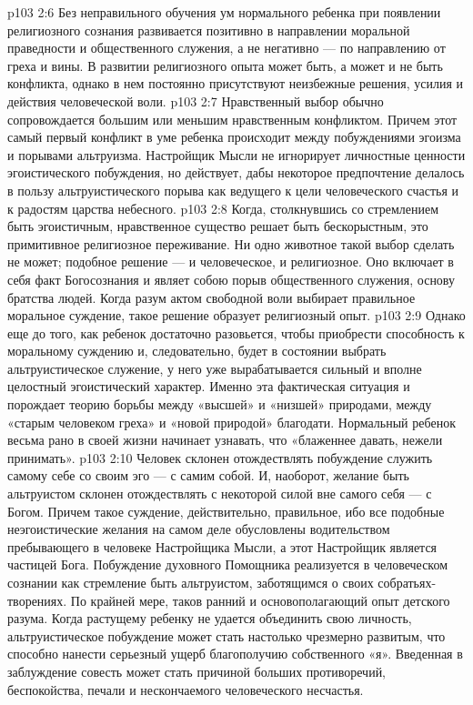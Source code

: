 \vs p103 2:6 Без неправильного обучения ум нормального ребенка при появлении религиозного сознания развивается позитивно в направлении моральной праведности и общественного служения, а не негативно --- по направлению от греха и вины. В развитии религиозного опыта может быть, а может и не быть конфликта, однако в нем постоянно присутствуют неизбежные решения, усилия и действия человеческой воли.
\vs p103 2:7 Нравственный выбор обычно сопровождается большим или меньшим нравственным конфликтом. Причем этот самый первый конфликт в уме ребенка происходит между побуждениями эгоизма и порывами альтруизма. Настройщик Мысли не игнорирует личностные ценности эгоистического побуждения, но действует, дабы некоторое предпочтение делалось в пользу альтруистического порыва как ведущего к цели человеческого счастья и к радостям царства небесного.
\vs p103 2:8 Когда, столкнувшись со стремлением быть эгоистичным, нравственное существо решает быть бескорыстным, это примитивное религиозное переживание. Ни одно животное такой выбор сделать не может; подобное решение --- и человеческое, и религиозное. Оно включает в себя факт Богосознания и являет собою порыв общественного служения, основу братства людей. Когда разум актом свободной воли выбирает правильное моральное суждение, такое решение образует религиозный опыт.
\vs p103 2:9 Однако еще до того, как ребенок достаточно разовьется, чтобы приобрести способность к моральному суждению и, следовательно, будет в состоянии выбрать альтруистическое служение, у него уже вырабатывается сильный и вполне целостный эгоистический характер. Именно эта фактическая ситуация и порождает теорию борьбы между «высшей» и «низшей» природами, между «старым человеком греха» и «новой природой» благодати. Нормальный ребенок весьма рано в своей жизни начинает узнавать, что «блаженнее давать, нежели принимать».
\vs p103 2:10 Человек склонен отождествлять побуждение служить самому себе со своим эго --- с самим собой. И, наоборот, желание быть альтруистом склонен отождествлять с некоторой силой вне самого себя --- с Богом. Причем такое суждение, действительно, правильное, ибо все подобные неэгоистические желания на самом деле обусловлены водительством пребывающего в человеке Настройщика Мысли, а этот Настройщик является частицей Бога. Побуждение духовного Помощника реализуется в человеческом сознании как стремление быть альтруистом, заботящимся о своих собратьях\hyp{}творениях. По крайней мере, таков ранний и основополагающий опыт детского разума. Когда растущему ребенку не удается объединить свою личность, альтруистическое побуждение может стать настолько чрезмерно развитым, что способно нанести серьезный ущерб благополучию собственного «я». Введенная в заблуждение совесть может стать причиной больших противоречий, беспокойства, печали и нескончаемого человеческого несчастья.
